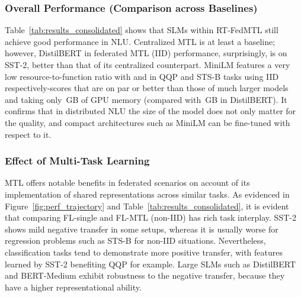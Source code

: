 \subsubsection{Overall Performance (Comparison across Baselines)} Table~\ref{tab:results_consolidated} shows that SLMs within RT-FedMTL still achieve good performance in NLU. Centralized MTL is at least a baseline; however, DistilBERT in federated MTL (IID) performance, surprisingly, is  on SST-2, better than that of its centralized counterpart. MiniLM features a very low resource-to-function ratio with  and  in QQP and STS-B tasks using IID respectively-scores that are on par or better than those of much larger models and taking only \,GB of GPU memory (compared with \,GB in DistilBERT). It confirms that in distributed NLU the size of the model does not only matter for the quality, and compact architectures such as MiniLM can be fine-tuned with respect to it. 

\subsubsection{Effect of Multi-Task Learning}
MTL offers notable benefits in federated scenarios on account of its implementation of shared representations across similar tasks. As evidenced in Figure~\ref{fig:perf_trajectory} and Table~\ref{tab:results_consolidated}, it is evident that comparing FL-single and FL-MTL (non-IID) has rich task interplay. SST-2 shows mild negative transfer in some setups, whereas it is usually worse for regression problems such as STS-B for non-IID situations. Nevertheless, classification tasks tend to demonstrate more positive transfer, with features learned by SST-2 benefiting QQP for example. Large SLMs such as DistilBERT and BERT-Medium exhibit robustness to the negative transfer, because they have a higher representational ability. 

